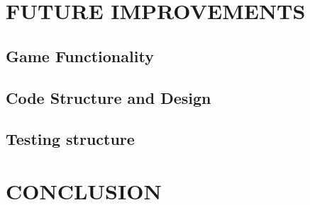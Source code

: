 \documentclass[10pt,twocolumn]{witseiepaper}
\begin{document}
\section{FUTURE IMPROVEMENTS}

\subsection{Game Functionality}

\subsection{Code Structure and Design}\label{code_improvements}

\subsection{Testing structure}

\section{CONCLUSION}

%



\end{document}
